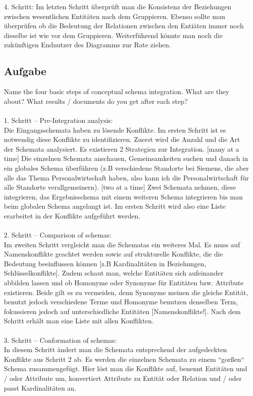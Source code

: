 \documentclass[11pt,a4paper,DIV=9]{scrartcl}
\newcounter{temp}
\newcommand{\aufgabe}[1]{
  \setcounter{temp}{\value{subsection}}
  \setcounter{subsection}{#1}
  \addtocounter{subsection}{-1}
  \subsection{Aufgabe}
  \setcounter{subsection}{\value{temp}}
}
\begin{document}
4. Schritt: Im letzten Schritt \"uberpr\"uft man die Konsistenz der Beziehungen zwischen wesentlichen Entit\"aten nach dem Gruppieren. Ebenso sollte man \"uberpr\"ufen ob die Bedeutung der Relationen zwischen den Enti\"aten immer noch dieselbe ist wie vor dem Gruppieren. Weiterf\"uhrend k\"onnte man noch die zuk\"unftigen Endnutzer des Diagramms zur Rate ziehen.
\aufgabe{2}
Name the four basic steps of conceptual schema integration. What are they about? What results / documents do you get after each step? \\
\\ 1. Schritt -- Pre-Integration analysis: \\ Die Eingangsschemata haben zu l\"osende Konflikte. Im ersten Schritt ist es notwendig diese Konflikte zu identifizieren. Zuerst wird die Anzahl und die Art der Schemata analysiert. Es existieren 2 Strategien zur Integration. [many at a time] Die einzelnen Schemata anschauen, Gemeinsamkeiten suchen und danach in ein globales Schema \"uberf\"uhren (z.B verschiedene Standorte bei Siemens, die aber alle das Thema Personalwirtschaft haben, also kann ich die Personalwirtschaft f\"ur alle Standorte verallgemeinern).
[two at a time] Zwei Schemata nehmen, diese integrieren, das Ergebnisschema mit einem weiteren Schema integrieren bis man beim globalen Schema angelangt ist.
Im ersten Schritt wird also eine Liste erarbeitet in der Konflikte aufgef\"uhrt werden.
\\\\ 2. Schritt -- Comparison of schemas: \\
Im zweiten Schritt vergleicht man die Schematas ein weiteres Mal. Es muss auf Namenskonflikte geachtet werden sowie auf strukturelle Konflikte, die die Bedeutung beeinflussen k\"onnen [z.B Kardinalit\"aten in Beziehungen, Schl\"usselkonflikte]. Zudem schaut man, welche Entit\"aten sich aufeinander abbilden lassen und ob Homonyme oder Synonyme f\"ur Entit\"aten bzw. Attribute existieren. Beide gilt es zu vermeiden, denn Synonyme meinen die gleiche Entit\"at, benutzt jedoch verschiedene Terme und Homonyme benutzen denselben Term, fokussieren jedoch auf unterschiedliche Entit\"aten [Namenskonflikte!]. Nach dem Schritt erh\"alt man eine Liste mit allen Konflikten.
\\\\ 3. Schritt -- Conformation of schemas: \\
In diesem Schritt \"andert man die Schemata entsprechend der aufgedeckten Konflikte aus Schritt 2 ab. Es werden die einzelnen Schemata zu einem ``gor{\ss}en`` Schema zusammengef\"ugt. Hier l\"ost man die Konflikte auf, benennt Entit\"aten und / oder Attribute um, konvertiert Attribute zu Entit\"at oder Relation und / oder passt Kardinalit\"aten an.
\end{document}

